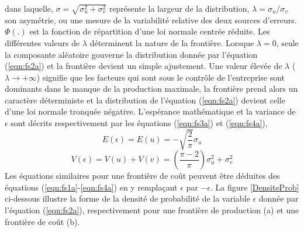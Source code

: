 dans laquelle, $\sigma = \sqrt{\sigma^{2}_{u}+\sigma^{2}_{v}}$ représente la largeur de la distribution, $\lambda=\sigma_{u}/\sigma_{v}$ son asymétrie, ou une mesure de la variabilité relative des deux sources d’erreurs. $\Phi\left(.\right)$ est la fonction de répartition d’une loi normale centrée réduite. Les différentes valeurs de $\lambda$ déterminent la nature de la frontière. Lorsque $\lambda = 0$, seule la composante aléatoire gouverne la distribution donnée par l’équation (\ref{eqn:fs2a}) et la frontière devient un simple ajustement. Une valeur élevée de $\lambda$ ($\lambda \rightarrow +\infty$) signifie que les facteurs qui sont sous le contrôle de l’entreprise sont dominants dans le manque de la production maximale, la frontière prend alors un caractère déterministe et la distribution de l'équation (\ref{eqn:fs2a}) devient celle d’une loi normale tronquée négative. L’espérance mathématique et la variance de $\epsilon$ sont décrits respectivement par les équations (\ref{eqn:fs3a}) et (\ref{eqn:fs4a}),
%
\begin{equation}\label{eqn:fs3a}
E\left(\epsilon\right)=E\left(u\right)=-\sqrt{\frac{2}{\pi}}\sigma_{u}
\end{equation}
%
\begin{equation}\label{eqn:fs4a}
V\left(\epsilon\right)=V\left(u\right)+V\left(v\right)=\left(\frac{\pi-2}{\pi}\right)\sigma^{2}_{u}+\sigma^{2}_{v}
\end{equation}
%
Les équations similaires pour une frontière de coût peuvent être déduites des équations (\ref {eqn:fs1a}-\ref{eqn:fs4a}) en y remplaçant $\epsilon $ par $ -\epsilon $. La figure \ref {DensiteProb} ci-dessous illustre la forme de la densité de probabilité de la variable $\epsilon$ donnée par l'équation (\ref{eqn:fs2a}), respectivement pour une frontière de production (a) et une frontière de coût (b).
%
